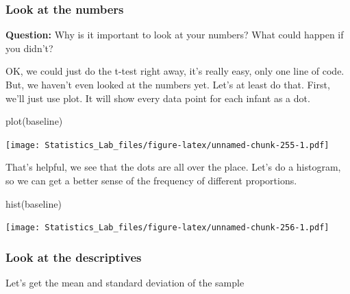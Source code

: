 \documentclass[
]{book}
\newenvironment{Shaded}{\begin{snugshade}}{\end{snugshade}}
\newcommand{\FunctionTok}[1]{\textcolor[rgb]{0.00,0.00,0.00}{#1}}
\newcommand{\NormalTok}[1]{#1}
\newcommand{\OtherTok}[1]{\textcolor[rgb]{0.56,0.35,0.01}{#1}}
\newcommand{\SpecialCharTok}[1]{\textcolor[rgb]{0.00,0.00,0.00}{#1}}
\begin{document}
\begin{Shaded}
\end{Shaded}

\hypertarget{look-at-the-numbers}{%
\subsubsection{Look at the numbers}\label{look-at-the-numbers}}

\textbf{Question:} Why is it important to look at your numbers? What could happen if you didn't?

OK, we could just do the t-test right away, it's really easy, only one line of code. But, we haven't even looked at the numbers yet. Let's at least do that. First, we'll just use plot. It will show every data point for each infant as a dot.

\begin{Shaded}
\begin{Highlighting}[]
\FunctionTok{plot}\NormalTok{(baseline)}
\end{Highlighting}
\end{Shaded}

\texttt{[image: Statistics\_Lab\_files/figure-latex/unnamed-chunk-255-1.pdf]}

That's helpful, we see that the dots are all over the place. Let's do a histogram, so we can get a better sense of the frequency of different proportions.

\begin{Shaded}
\begin{Highlighting}[]
\FunctionTok{hist}\NormalTok{(baseline)}
\end{Highlighting}
\end{Shaded}

\texttt{[image: Statistics\_Lab\_files/figure-latex/unnamed-chunk-256-1.pdf]}

\hypertarget{look-at-the-descriptives}{%
\subsubsection{Look at the descriptives}\label{look-at-the-descriptives}}

Let's get the mean and standard deviation of the sample
\end{document}
